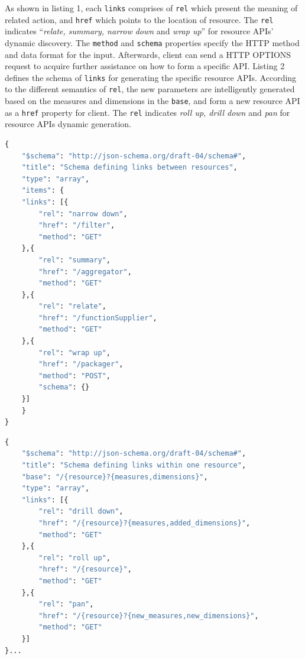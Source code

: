 \documentclass[10pt, conference, compsocconf]{IEEEtran}
\begin{document}
As shown in listing 1, each \texttt{links} comprises of \texttt{rel} which present the meaning of related action, and \texttt{href} which points to the location of resource. The \texttt{rel} indicates “\textit{relate, summary, narrow down} and \textit{wrap up}” for resource APIs' dynamic discovery. The \texttt{method} and \texttt{schema} properties specify the HTTP method and data format for the input. Afterwards, client can send a HTTP OPTIONS request to acquire further assistance on how to form a specific API. Listing 2 defines the schema of \texttt{links} for generating the specific resource APIs. According to the different semantics of \texttt{rel}, the new parameters are intelligently generated based on the measures and dimensions in the \texttt{base}, and form a new resource API as a \texttt{href} property for client. The \texttt{rel} indicates \textit{roll up, drill down} and \textit{pan} for resource APIs dynamic generation.
\lstset{style=mystyle}

\begin{lstlisting}[language=python, caption=HyperSchema of Links for Dynamical Discovery]
{
	"$schema": "http://json-schema.org/draft-04/schema#",
	"title": "Schema defining links between resources",
	"type": "array",
	"items": {
	"links": [{
		"rel": "narrow down",
		"href": "/filter",
		"method": "GET"
	},{
		"rel": "summary",
		"href": "/aggregator",
		"method": "GET"
	},{
		"rel": "relate",
		"href": "/functionSupplier",
		"method": "GET"
	},{
		"rel": "wrap up",
		"href": "/packager",
		"method": "POST",
		"schema": {}
	}]
	}
}
\end{lstlisting}
\begin{lstlisting}[language=Python, caption=HyperSchema of Links for Dynamical Generation]
{
	"$schema": "http://json-schema.org/draft-04/schema#",
	"title": "Schema defining links within one resource",
	"base": "/{resource}?{measures,dimensions}",
	"type": "array",
	"links": [{
		"rel": "drill down",
		"href": "/{resource}?{measures,added_dimensions}",
		"method": "GET"
	},{
		"rel": "roll up",
		"href": "/{resource}",
		"method": "GET"
	},{
		"rel": "pan",
		"href": "/{resource}?{new_measures,new_dimensions}",
		"method": "GET"
	}]
}...
\end{lstlisting}
\end{document}
